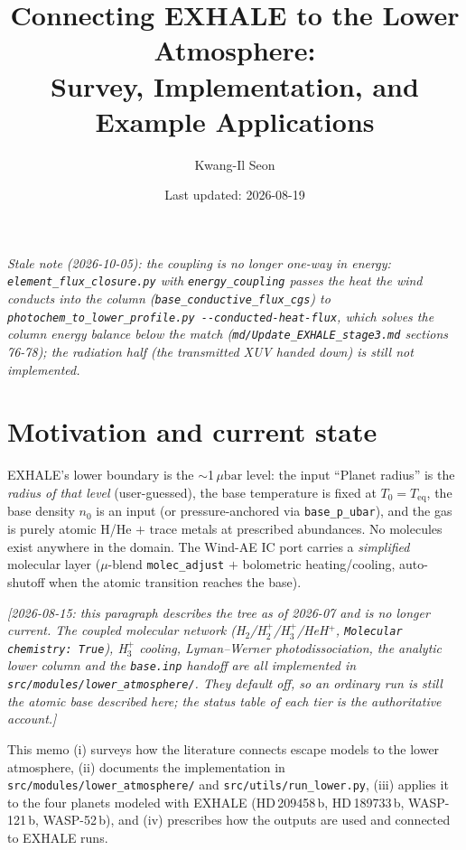 \documentclass[english,a4paper]{my_memo}
\title{Connecting EXHALE to the Lower Atmosphere:\\ Survey, Implementation, and Example Applications}
\author{Kwang-Il Seon}
\date{Last updated: 2026-08-19}
\newcommand{\ubar}{\mu\mathrm{bar}}
\begin{document}
\maketitle

\noindent\textit{Stale note (2026-10-05): the coupling is no longer one-way in energy: \texttt{element\_flux\_closure.py} with \texttt{energy\_coupling} passes the heat the wind conducts into the column (\texttt{base\_conductive\_flux\_cgs}) to \texttt{photochem\_to\_lower\_profile.py -{}-conducted-heat-flux}, which solves the column energy balance below the match (\texttt{md/Update\_EXHALE\_stage3.md} sections 76-78); the radiation half (the transmitted XUV handed down) is still not implemented.}

\section{Motivation and current state}

EXHALE's lower boundary is the $\sim$1\,$\ubar$ level: the input ``Planet radius'' is the
\emph{radius of that level} (user-guessed), the base temperature is fixed at
$T_0=T_\mathrm{eq}$, the base density $n_0$ is an input (or pressure-anchored via
\texttt{base\_p\_ubar}), and the gas is purely atomic H/He $+$ trace metals at prescribed
abundances. No molecules exist anywhere in the domain. The Wind-AE IC port carries a
\emph{simplified} molecular layer ($\mu$-blend \texttt{molec\_adjust} $+$ bolometric
heating/cooling, auto-shutoff when the atomic transition reaches the base).

\emph{[2026-08-15: this paragraph describes the tree as of 2026-07 and is no
longer current. The coupled molecular network (H$_2$/H$_2^+$/H$_3^+$/HeH$^+$,
\texttt{Molecular chemistry: True}), H$_3^+$ cooling, Lyman--Werner
photodissociation, the analytic lower column and the \texttt{base.inp} handoff
are all implemented in \texttt{src/modules/lower\_atmosphere/}. They default
off, so an ordinary run is still the atomic base described here; the status table
of each tier is the authoritative account.]}

This memo (i) surveys how the literature connects escape models to the lower atmosphere,
(ii) documents the implementation in \texttt{src/modules/lower\_atmosphere/} and
\texttt{src/utils/run\_lower.py}, (iii) applies it to the four planets modeled with
EXHALE (HD\,209458\,b, HD\,189733\,b, WASP-121\,b, WASP-52\,b), and (iv) prescribes how
the outputs are used and connected to EXHALE runs.
\end{document}
